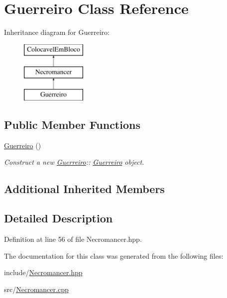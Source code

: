 \hypertarget{class_guerreiro}{}\section{Guerreiro Class Reference}
\label{class_guerreiro}
Inheritance diagram for Guerreiro\+:\begin{figure}[H]
\begin{center}
\leavevmode
\includegraphics[height=3.000000cm]{class_guerreiro}
\end{center}
\end{figure}
\subsection*{Public Member Functions}
\begin{DoxyCompactItemize}
\item 
\mbox{\label{class_guerreiro_a161ed48fa288b011c1c251520e811639}} 
\mbox{\hyperlink{class_guerreiro_a161ed48fa288b011c1c251520e811639}{Guerreiro}} ()
\begin{DoxyCompactList}\small\item\em Construct a new \mbox{\hyperlink{class_guerreiro}{Guerreiro}}\+:\+: \mbox{\hyperlink{class_guerreiro}{Guerreiro}} object. \end{DoxyCompactList}\end{DoxyCompactItemize}
\subsection*{Additional Inherited Members}


\subsection{Detailed Description}


Definition at line 56 of file Necromancer.\+hpp.



The documentation for this class was generated from the following files\+:\begin{DoxyCompactItemize}
\item 
include/\mbox{\hyperlink{_necromancer_8hpp}{Necromancer.\+hpp}}\item 
src/\mbox{\hyperlink{_necromancer_8cpp}{Necromancer.\+cpp}}\end{DoxyCompactItemize}
